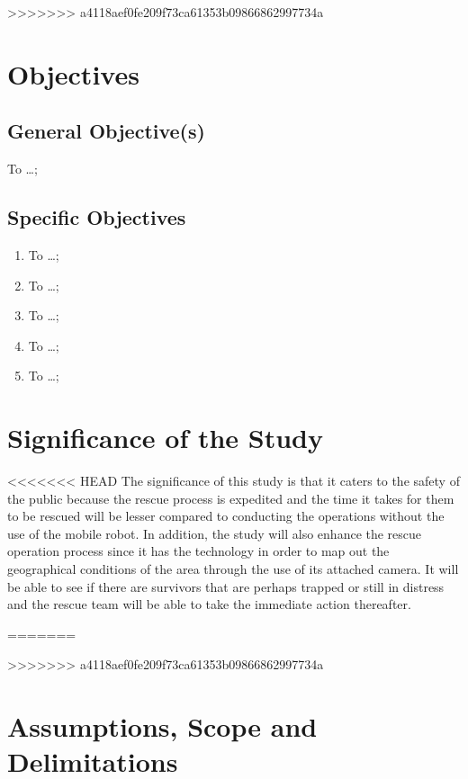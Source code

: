>>>>>>> a4118aef0fe209f73ca61353b09866862997734a
\section{Objectives}
\subsection{General Objective(s)}
To \ldots;

\subsection{Specific Objectives}

\begin{enumerate}
	\item To  \ldots;
	
	\item To  \ldots;
	
	\item To  \ldots;
	
	\item To  \ldots;
	
	\item To  \ldots;
\end{enumerate}



\section{Significance of the Study}

<<<<<<< HEAD
	The significance of this study is that it caters to the safety of the public because the rescue process is expedited and the time it takes for them to be rescued will be lesser compared to conducting the operations without the use of the mobile robot. In addition, the study will also enhance the rescue operation process since it has the technology in order to map out the geographical conditions of the area through the use of its attached camera. It will be able to see if there are survivors that are perhaps trapped or still in distress and the rescue team will be able to take the immediate action thereafter.

\blindtext

=======
\blindtext



>>>>>>> a4118aef0fe209f73ca61353b09866862997734a
\section{Assumptions, Scope and Delimitations}

